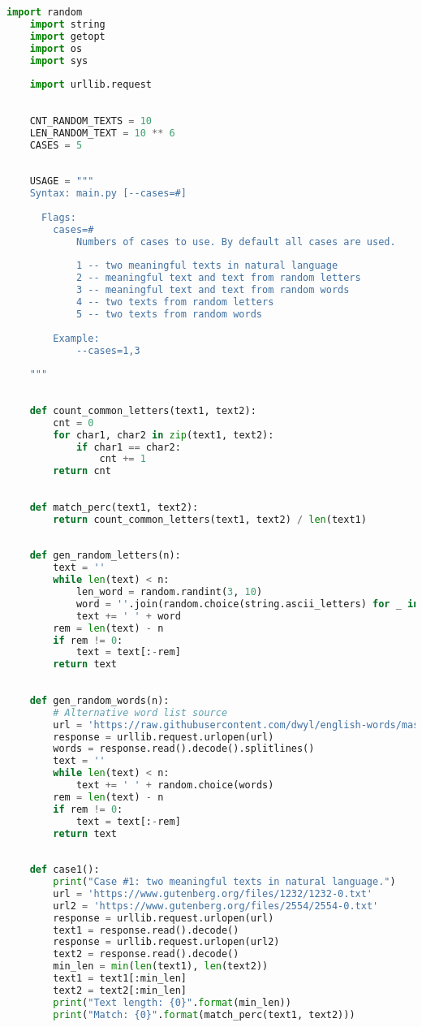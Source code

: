\documentclass[12pt]{article}
\begin{document}
\begin{lstlisting}[language=Python]
    import random
    import string
    import getopt
    import os
    import sys
    
    import urllib.request
    
    
    CNT_RANDOM_TEXTS = 10
    LEN_RANDOM_TEXT = 10 ** 6
    CASES = 5
    
    
    USAGE = """
    Syntax: main.py [--cases=#]
    
      Flags:
        cases=#
            Numbers of cases to use. By default all cases are used.
    
            1 -- two meaningful texts in natural language
            2 -- meaningful text and text from random letters
            3 -- meaningful text and text from random words
            4 -- two texts from random letters
            5 -- two texts from random words
    
        Example:
            --cases=1,3
    
    """
    
    
    def count_common_letters(text1, text2):
        cnt = 0
        for char1, char2 in zip(text1, text2):
            if char1 == char2:
                cnt += 1
        return cnt
    
    
    def match_perc(text1, text2):
        return count_common_letters(text1, text2) / len(text1)
    
    
    def gen_random_letters(n):
        text = ''
        while len(text) < n:
            len_word = random.randint(3, 10)
            word = ''.join(random.choice(string.ascii_letters) for _ in range(len_word))
            text += ' ' + word
        rem = len(text) - n
        if rem != 0:
            text = text[:-rem]
        return text
    
    
    def gen_random_words(n):
        # Alternative word list source
        url = 'https://raw.githubusercontent.com/dwyl/english-words/master/words.txt'
        response = urllib.request.urlopen(url)
        words = response.read().decode().splitlines()
        text = ''
        while len(text) < n:
            text += ' ' + random.choice(words)
        rem = len(text) - n
        if rem != 0:
            text = text[:-rem]
        return text
    
    
    def case1():
        print("Case #1: two meaningful texts in natural language.")
        url = 'https://www.gutenberg.org/files/1232/1232-0.txt'
        url2 = 'https://www.gutenberg.org/files/2554/2554-0.txt'
        response = urllib.request.urlopen(url)
        text1 = response.read().decode()
        response = urllib.request.urlopen(url2)
        text2 = response.read().decode()
        min_len = min(len(text1), len(text2))
        text1 = text1[:min_len]
        text2 = text2[:min_len]
        print("Text length: {0}".format(min_len))
        print("Match: {0}".format(match_perc(text1, text2)))
    

\end{lstlisting}
\end{document}
